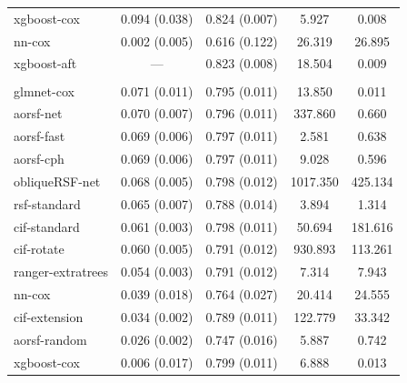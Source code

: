 \documentclass{article}\usepackage[]{graphicx}\usepackage[]{xcolor}
\newenvironment{knitrout}{}{} %
\begin{document}
\begin{knitrout}
\begin{longtable}[t]{lcccc}
\hspace{1em}xgboost-cox & 0.094 (0.038) & 0.824 (0.007) & 5.927 & 0.008\\
\hspace{1em}nn-cox & 0.002 (0.005) & 0.616 (0.122) & 26.319 & 26.895\\
\hspace{1em}xgboost-aft & --- & 0.823 (0.008) & 18.504 & 0.009\\
\addlinespace[0.3em]
\multicolumn{5}{l}{\textit{\textbf{SPRINT; CVD death, n = 9361, p = 174}}}\\
\hline
\hspace{1em}glmnet-cox & 0.071 (0.011) & 0.795 (0.011) & 13.850 & 0.011\\
\hspace{1em}aorsf-net & 0.070 (0.007) & 0.796 (0.011) & 337.860 & 0.660\\
\hspace{1em}aorsf-fast & 0.069 (0.006) & 0.797 (0.011) & 2.581 & 0.638\\
\hspace{1em}aorsf-cph & 0.069 (0.006) & 0.797 (0.011) & 9.028 & 0.596\\
\hspace{1em}obliqueRSF-net & 0.068 (0.005) & 0.798 (0.012) & 1017.350 & 425.134\\
\hspace{1em}rsf-standard & 0.065 (0.007) & 0.788 (0.014) & 3.894 & 1.314\\
\hspace{1em}cif-standard & 0.061 (0.003) & 0.798 (0.011) & 50.694 & 181.616\\
\hspace{1em}cif-rotate & 0.060 (0.005) & 0.791 (0.012) & 930.893 & 113.261\\
\hspace{1em}ranger-extratrees & 0.054 (0.003) & 0.791 (0.012) & 7.314 & 7.943\\
\hspace{1em}nn-cox & 0.039 (0.018) & 0.764 (0.027) & 20.414 & 24.555\\
\hspace{1em}cif-extension & 0.034 (0.002) & 0.789 (0.011) & 122.779 & 33.342\\
\hspace{1em}aorsf-random & 0.026 (0.002) & 0.747 (0.016) & 5.887 & 0.742\\
\hspace{1em}xgboost-cox & 0.006 (0.017) & 0.799 (0.011) & 6.888 & 0.013\\

\end{longtable}
\end{knitrout}
\end{document}
